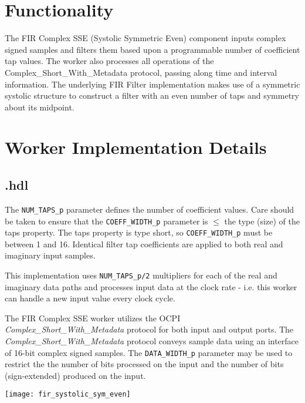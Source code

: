 \section*{Functionality}
\begin{flushleft}
	The FIR Complex SSE (Systolic Symmetric Even) component inputs complex signed samples and filters them based upon a programmable number of coefficient tap values. The worker also processes all operations of the Complex\_Short\_With\_Metadata protocol, passing along time and interval information. The underlying FIR Filter implementation makes use of a symmetric systolic structure to construct a filter with an even number of taps and symmetry about its midpoint.
\end{flushleft}

\section*{Worker Implementation Details}
\subsection*{\comp.hdl}
\begin{flushleft}
	The \verb+NUM_TAPS_p+ parameter defines the number of coefficient values. Care should be taken to ensure that the \verb+COEFF_WIDTH_p+ parameter is $\le$ the type (size) of the taps property. The taps property is type short, so \verb+COEFF_WIDTH_p+ must be between 1 and 16. Identical filter tap coefficients are applied to both real and imaginary input samples.\medskip

	This implementation uses \verb+NUM_TAPS_p/2+ multipliers for each of the real and imaginary data paths and processes input data at the clock rate - i.e. this worker can handle a new input value every clock cycle.\medskip

	The FIR Complex SSE worker utilizes the OCPI \textit{Complex\_Short\_With\_Metadata} protocol for both input and output ports. The \textit{Complex\_Short\_With\_Metadata} protocol conveys sample data using an interface of 16-bit complex signed samples. The \verb+DATA_WIDTH_p+ parameter may be used to restrict the the number of bits processed on the input and the number of bits (sign-extended) produced on the input.
\end{flushleft}
{\centering\captionsetup{type=figure}\texttt{[image: fir\_systolic\_sym\_even]}\par{}\label{fig:circuit}}

